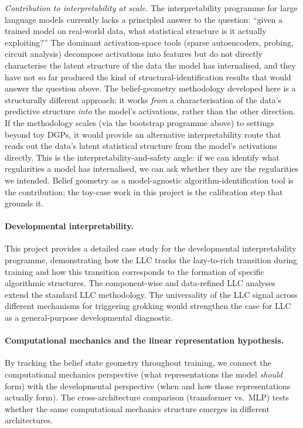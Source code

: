 \documentclass[11pt,a4paper]{article}
\begin{document}
\emph{Contribution to interpretability at scale.} The interpretability programme for large language models currently lacks a principled answer to the question: ``given a trained model on real-world data, what statistical structure is it actually exploiting?'' The dominant activation-space tools (sparse autoencoders, probing, circuit analysis) decompose activations into features but do not directly characterise the latent structure of the data the model has internalised, and they have not so far produced the kind of structural-identification results that would answer the question above. The belief-geometry methodology developed here is a structurally different approach: it works \emph{from} a characterisation of the data's predictive structure \emph{into} the model's activations, rather than the other direction. If the methodology scales (via the bootstrap programme above) to settings beyond toy DGPs, it would provide an alternative interpretability route that reads out the data's latent statistical structure from the model's activations directly. This is the interpretability-and-safety angle: if we can identify what regularities a model has internalised, we can ask whether they are the regularities we intended. Belief geometry as a model-agnostic algorithm-identification tool is the contribution; the toy-case work in this project is the calibration step that grounds it.

\paragraph{Developmental interpretability.} This project provides a detailed case study for the developmental interpretability programme, demonstrating how the LLC tracks the lazy-to-rich transition during training and how this transition corresponds to the formation of specific algorithmic structures. The component-wise and data-refined LLC analyses extend the standard LLC methodology. The universality of the LLC signal across different mechanisms for triggering grokking would strengthen the case for LLC as a general-purpose developmental diagnostic.

\paragraph{Computational mechanics and the linear representation hypothesis.} By tracking the belief state geometry throughout training, we connect the computational mechanics perspective (what representations the model \emph{should} form) with the developmental perspective (when and how those representations actually form). The cross-architecture comparison (transformer vs.\ MLP) tests whether the same computational mechanics structure emerges in different architectures.
\end{document}
